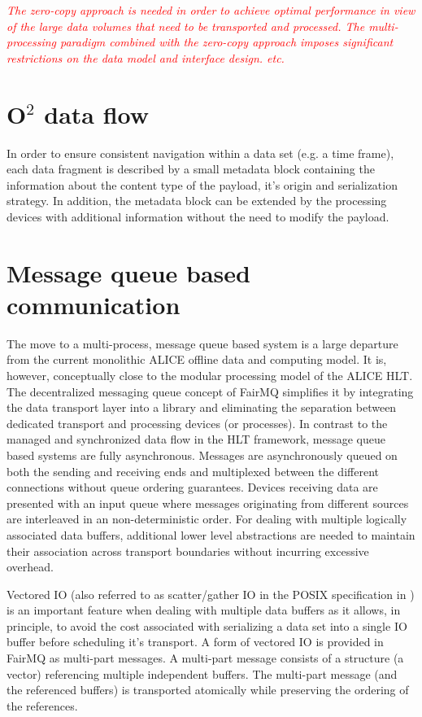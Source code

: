 \documentclass[a4paper,twoside]{article}
\newcommand\comment[1]{\textcolor{red}{\emph{#1}}}
\def\O2{O$^2$}
\begin{document}
\comment{
The zero-copy approach is needed in order to achieve optimal performance in view of the large data volumes that need to be transported and processed.
The multi-processing paradigm combined with the zero-copy approach imposes significant restrictions on the data model and interface design. 
etc.
}

\section{\O2 data flow}



In order to ensure consistent navigation within a data set (e.g. a time frame), each data fragment is described by a small metadata block containing the information about the content type of the payload, it's origin and serialization strategy.
In addition, the metadata block can be extended by the processing devices with additional information without the need to modify the payload.

\section{Message queue based communication}
The move to a multi-process, message queue based system is a large departure from the current monolithic ALICE offline data and computing model. It is, however, conceptually close to the modular processing model of the ALICE HLT. The decentralized messaging queue concept of FairMQ simplifies it by integrating the data transport layer into a library and eliminating the separation between dedicated transport and processing devices (or processes).
In contrast to the managed and synchronized data flow in the HLT framework, message queue based systems are fully asynchronous. Messages are asynchronously queued on both the sending and receiving ends and multiplexed between the different connections without queue ordering guarantees. Devices receiving data are presented with an input queue where messages originating from different sources are interleaved in an non-deterministic order. For dealing with multiple logically associated data buffers, additional lower level abstractions are needed to maintain their association across transport boundaries without incurring excessive overhead.

Vectored IO (also referred to as scatter/gather IO in the POSIX specification in \cite{posix}) is an important feature when dealing with multiple data buffers as it allows, in principle, to avoid the cost associated with serializing a data set into a single IO buffer before scheduling it's transport.
A form of vectored IO is provided in FairMQ as multi-part messages. A multi-part message consists of a structure (a vector) referencing multiple independent buffers. The multi-part message (and the referenced buffers) is transported atomically while preserving the ordering of the references.
\end{document}
